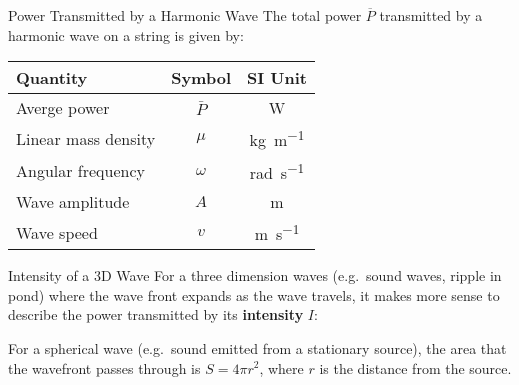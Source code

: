 \documentclass[12pt,aspectratio=169]{beamer}
\newcommand{\pic}[2]{\texttt{[image: \#2]}}
\newcommand{\eq}[2]{\vspace{#1}{\Large\begin{displaymath}#2\end{displaymath}}}
\begin{document}
\begin{frame}{Power Transmitted by a Harmonic Wave}
  The total power $\overline{P}$ transmitted by a harmonic wave on a string is
  given by:

  \eq{-.2in}{
    \boxed{\overline{P}=\frac12\mu\omega^2A^2v}
  }
  \begin{center}
    \begin{tabular}{l|c|c}
      \rowcolor{pink}
      \textbf{Quantity} & \textbf{Symbol} & \textbf{SI Unit} \\ \hline
      Averge power        & $\bar{P}$ & \si{\watt} \\
      Linear mass density & $\mu$     & \si{\kilo\gram\per\metre}\\
      Angular frequency   & $\omega$  & \si{rad\per\second}\\
      Wave amplitude      & $A$       & \si{\metre} \\
      Wave speed          & $v$       & \si{\metre\per\second}
    \end{tabular}
  \end{center}  
\end{frame}



\begin{frame}{Intensity of a 3D Wave}
  For a three dimension waves (e.g.\ sound waves, ripple in pond) where the
  wave front expands as the wave travels, it makes more sense to describe the
  power transmitted by its \textbf{intensity} $I$:

  \eq{-.25in}{
    \boxed{I=\frac{\overline{P}}{S}} %
  }

  For a spherical wave (e.g.\ sound emitted from a stationary source), the
  area that the wavefront passes through is $S=4\pi r^2$, where $r$ is the
  distance from the source.
\end{frame}





%
%
%
%
%
%
\end{document}
